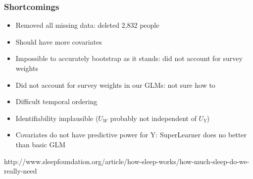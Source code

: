 \documentclass{beamer}
\begin{document}
\begin{frame}
\frametitle{Shortcomings}
  \begin{itemize}
    \vfill\item Removed all missing data: deleted 2,832 people
    \vfill\item Should have more covariates
    \vfill\item Impossible to accurately bootstrap as it stands: did not account for survey weights
    \vfill\item Did not account for survey weights in our GLMs: not sure how to
    \vfill\item Difficult temporal ordering
    \vfill\item Identifiability implausible ($U_W$ probably not independent of $U_Y$)
    \vfill\item Covariates do not have predictive power for Y: SuperLearner does no better than basic GLM
  \end{itemize}
  \vfill
\end{frame}

\begin{frame}
http://www.sleepfoundation.org/article/how-sleep-works/how-much-sleep-do-we-really-need
\end{frame}
\end{document}
